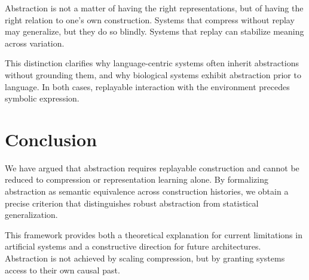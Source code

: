 \documentclass[11pt]{article}
\begin{document}
Abstraction is not a matter of having the right representations, but of having the right relation to one's own construction. Systems that compress without replay may generalize, but they do so blindly. Systems that replay can stabilize meaning across variation.

This distinction clarifies why language-centric systems often inherit abstractions without grounding them, and why biological systems exhibit abstraction prior to language. In both cases, replayable interaction with the environment precedes symbolic expression.

\section{Conclusion}

We have argued that abstraction requires replayable construction and cannot be reduced to compression or representation learning alone. By formalizing abstraction as semantic equivalence across construction histories, we obtain a precise criterion that distinguishes robust abstraction from statistical generalization.

This framework provides both a theoretical explanation for current limitations in artificial systems and a constructive direction for future architectures. Abstraction is not achieved by scaling compression, but by granting systems access to their own causal past.
\end{document}
